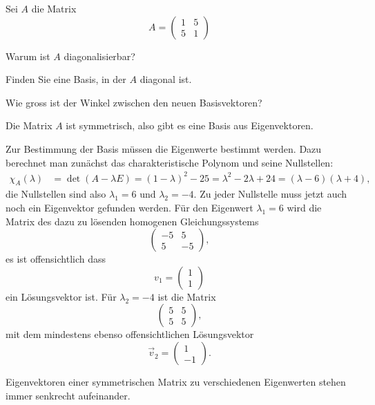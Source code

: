 Sei $A$ die Matrix
\[
A=\begin{pmatrix}
1&5\\
5&1
\end{pmatrix}
\]
\begin{teilaufgaben}
\item Warum ist $A$ diagonalisierbar?
\item Finden Sie eine Basis, in der $A$ diagonal ist.
\item Wie gross ist der Winkel zwischen den neuen Basisvektoren?
\end{teilaufgaben}


\begin{loesung}
\begin{teilaufgaben}
\item
Die Matrix $A$ ist symmetrisch, also gibt es eine Basis aus
Eigenvektoren.
\item
Zur Bestimmung der Basis müssen die Eigenwerte bestimmt werden.
Dazu berechnet man zunächst das charakteristische Polynom und
seine Nullstellen:
\begin{align*}
\chi_A(\lambda)
&=\det(A-\lambda E)=(1-\lambda)^2-25=\lambda^2-2\lambda +24
=(\lambda-6)(\lambda +4),
\end{align*}
die Nullstellen sind also $\lambda_1=6$ und $\lambda_2=-4$. Zu jeder
Nullstelle muss jetzt auch noch ein Eigenvektor gefunden werden.
Für den Eigenwert $\lambda_1=6$ wird die Matrix des dazu zu lösenden
homogenen Gleichungssystems
\[
\begin{pmatrix}-5&5\\5&-5\end{pmatrix},
\]
es ist offensichtlich dass
\[
v_1=\begin{pmatrix}1\\1\end{pmatrix}
\]
ein Lösungsvektor ist. Für $\lambda_2=-4$ ist die Matrix
\[
\begin{pmatrix}5&5\\5&5\end{pmatrix},
\]
mit dem mindestens ebenso offensichtlichen Lösungsvektor
\[
\vec v_2=\begin{pmatrix}1\\-1\end{pmatrix}.
\]
\item
Eigenvektoren einer symmetrischen Matrix zu verschiedenen Eigenwerten
stehen immer senkrecht aufeinander.
\qedhere
\end{teilaufgaben}
\end{loesung}

